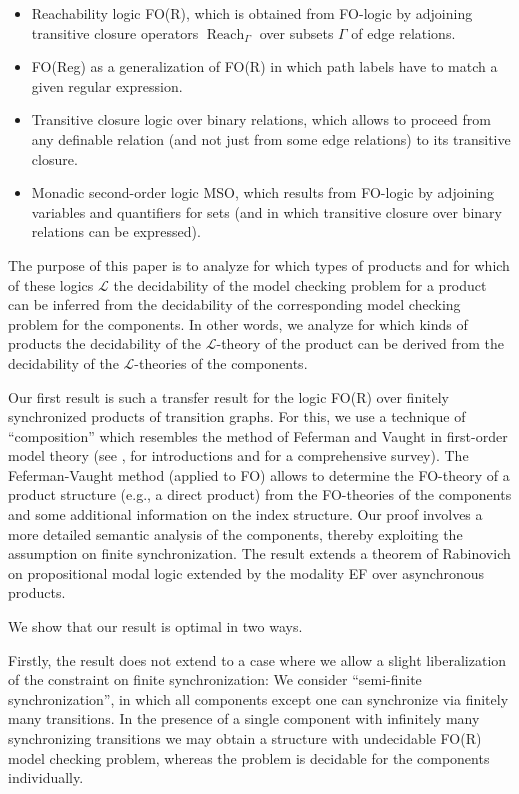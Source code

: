 \documentclass{LMCS}
\DeclareMathOperator{\Reach}{Reach}
\begin{document}
\begin{itemize}
\item Reachability logic FO(R), which is obtained from FO-logic by 
 adjoining transitive closure operators $\Reach_\Gamma$ over subsets $\Gamma$ of 
 edge relations.
\item FO(Reg) as a generalization of FO(R) in which path labels have to match 
 a given regular expression.
\item Transitive closure logic over binary relations, which allows to proceed 
 from any definable relation (and not just from some edge relations) to 
 its transitive closure.
\item Monadic second-order logic MSO, which results from FO-logic by adjoining 
 variables and quantifiers for sets (and in which transitive closure over 
 binary relations can be expressed).
\end{itemize}

The purpose of this paper is to analyze for which types of products 
and for which of these logics $\mathcal{L}$
the decidability of the model checking problem for a  
product can be inferred from the 
decidability of the corresponding model checking problem for the components. 
In other words, we analyze for which kinds of products the decidability 
of the $\mathcal{L}$-theory of the product can be derived from the 
decidability of the $\mathcal{L}$-theories of the components. 

Our first result is such a transfer result for the logic FO(R) over 
finitely synchronized products of transition graphs. For this, we 
use a technique of ``composition'' which resembles the method of 
Feferman and Vaught \cite{fv59} in first-order model theory 
(see 
\cite{ck73}, \cite{hodg93} for introductions and \cite{Ma04} for 
a comprehensive survey). The Feferman-Vaught method (applied to FO) 
allows 
to determine the FO-theory of a product structure (e.g., 
a direct product) from the FO-theories of the components and 
some additional information on the index structure. Our proof involves 
a more detailed semantic analysis of the components, thereby exploiting the 
assumption on finite synchronization. The result 
extends a theorem of Rabinovich \cite{rabino07} on propositional modal 
logic extended by the modality EF over asynchronous products.

We show that our result is optimal in two ways.

Firstly, the result does not extend to a case where we allow a slight 
liberalization of the constraint on finite synchronization: We consider 
``semi-finite synchronization'', 
in which all components except one can synchronize via finitely many 
transitions. In the presence of a single component with infinitely many 
synchronizing transitions we may obtain a structure with undecidable 
FO(R) model checking problem, whereas the problem is decidable for the 
components individually. 
 
\end{document}
